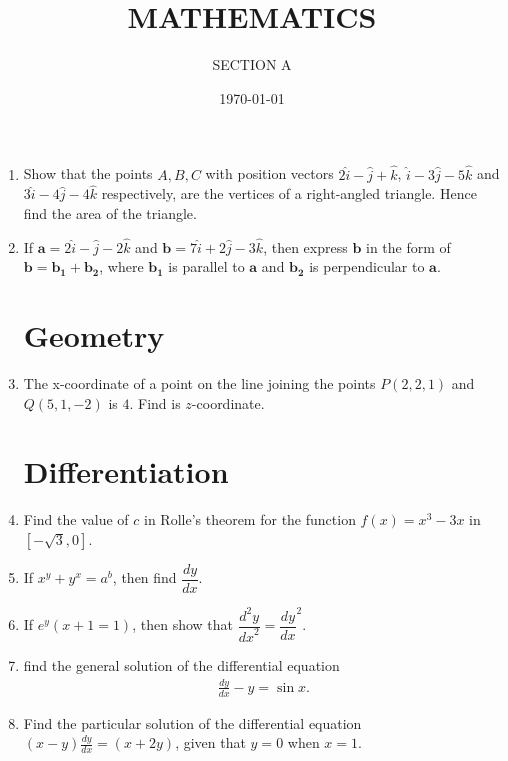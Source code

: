 \documentclass[10pt,-letter paper]{article}
\title{MATHEMATICS}
\author{SECTION A}
\date{\today}
\let\vec\mathbf{}
\let\vec\mathbf{}
\providecommand{\brak}[1]{\ensuremath{\left(#1\right)}}
\providecommand{\sbrak}[1]{\ensuremath{\left[#1\right]}}
\begin{document}
\maketitle
\begin{enumerate}
\section{Vectors}
\item Show that the points $A, B, C$ with position vectors $2 \hat{i}-\hat{j}+\hat{k}$, $\hat{i}-3 \hat{j}-5\hat{k}$ and $3\hat{i}-4 \hat{j}-4 \hat{k}$ respectively, are the vertices of a right-angled triangle. Hence find the area of the triangle.
\item If $\vec{a} = 2\hat{i}-\hat{j}-2\hat{k}$ and $\vec{b} = 7\hat{i}+2\hat{j}-3\hat{k}$, then express $\vec{b}$ in the form of $\vec{b}=\vec{b_1}+\vec{b_2}$, where $\vec{b_1}$ is parallel to $\vec{a}$ and $\vec{b_2}$ is perpendicular to $\vec{a}$.
\section{Geometry}
\item The x-coordinate of a point on the line joining the points $P\brak{2, 2, 1}$ and $Q\brak{5, 1, -2}$ is $4$. Find is $z$-coordinate.
\section{Differentiation}
\item Find the value of $c$ in Rolle's theorem for the function $f\brak{x} = {x}^{3}-3x$ in $\sbrak {-\sqrt{3}, 0}$.
\item If ${x}^{y}+{y}^{x}={a}^{b}$, then find $\dfrac{dy}{dx}$.
\item If ${e}^{y}\brak{x+1=1}$, then show that $\dfrac{{d}^{2} y}{{dx}^{2}}=\dfrac{dy}{{dx}}^2$.
\item find the general solution of the differential equation
\begin{align*}
\frac{dy}{dx}-y=\sin x.
\end{align*}
\item Find the particular solution of the differential equation $\brak{x-y}\frac{dy}{dx} =\brak{x+2y}$, given that $y=0$ when $x=1$.

\end{enumerate}
\end{document}
